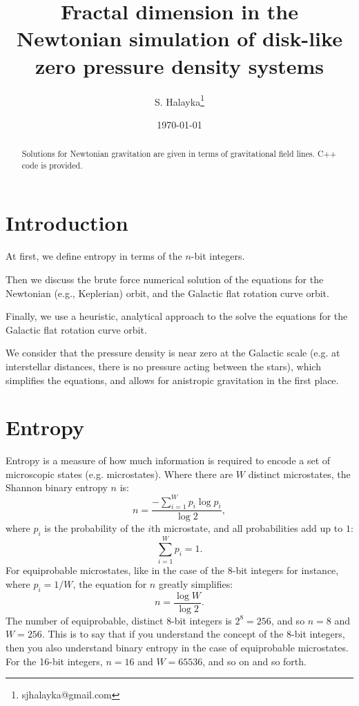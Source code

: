 \documentclass[12pt]{article}
\title{Fractal dimension in the Newtonian simulation of disk-like zero pressure density systems}
\author{S. Halayka\footnote{sjhalayka@gmail.com}}
\date{\today\;\currenttime}
\begin{document}
 
\maketitle

\begin{abstract}
Solutions for Newtonian gravitation are given in terms of gravitational field lines.
C++ code is provided.
\end{abstract}



\section{Introduction}

At first, we define entropy in terms of the $n$-bit integers.

Then we discuss the brute force numerical solution of the equations for the Newtonian (e.g., Keplerian) orbit, and the Galactic flat rotation curve orbit.

Finally, we use a heuristic, analytical approach to the solve the equations for the Galactic flat rotation curve orbit.

We consider that the pressure density is near zero at the Galactic scale (e.g. at interstellar distances, there is no pressure acting between the stars), which simplifies the equations, and allows for anistropic gravitation in the first place.



\section{Entropy}
Entropy is a measure of how much information is required to encode a set of microscopic states (e.g. microstates).
Where there are $W$ distinct microstates, the Shannon binary entropy $n$ is:
\begin{equation}
n =  \frac{-\sum_{i = 1}^{W} p_i \log p_i} {\log 2},
\end{equation}
where $p_i$ is the probability of the $i$th microstate, and all probabilities add up to $1$:
\begin{equation}
\sum_{i = 1}^{W} p_i = 1.
\end{equation}
For equiprobable microstates, like in the case of the 8-bit integers for instance, where $p_i = 1/W$, the equation for $n$ greatly simplifies:
\begin{equation}
n = \frac{\log W}{\log 2}.
\end{equation}
The number of equiprobable, distinct 8-bit integers is $2^8 = 256$, and so $n = 8$ and $W= 256$.
This is to say that if you understand the concept of the 8-bit integers, then you also understand binary entropy in the case of equiprobable microstates.
For the 16-bit integers, $n = 16$ and $W = 65536$, and so on and so forth.
\end{document}
